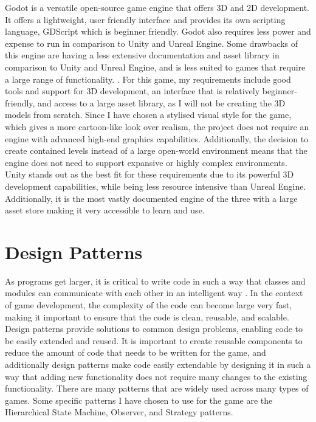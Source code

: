 \documentclass[]{final_report}
\begin{document}
Godot is a versatile open-source game engine that offers 3D and 2D development. It offers a lightweight, user friendly interface and provides its own scripting language, GDScript which is beginner friendly. Godot also requires less power and expense to run in comparison to Unity and Unreal Engine. Some drawbacks of this engine are having a less extensive documentation and asset library in comparison to Unity and Unreal Engine, and is less suited to games that require a large range of functionality. \cite{hatton_2024}. \newline
For this game, my requirements include good tools and support for 3D development, an interface that is relatively beginner-friendly, and access to a large asset library, as I will not be creating the 3D models from scratch. Since I have chosen a stylised visual style for the game, which gives a more cartoon-like look over realism, the project does not require an engine with advanced high-end graphics capabilities. Additionally, the decision to create contained levels instead of a large open-world environment means that the engine does not need to support expansive or highly complex environments.
Unity stands out as the best fit for these requirements due to its powerful 3D development capabilities, while being less resource intensive than Unreal Engine. Additionally, it is the most vastly documented engine of the three with a large asset store making it very accessible to learn and use.
\section{Design Patterns}
As programs get larger, it is critical to write code in such a way that classes and modules can communicate with each other in an intelligent way \cite{Doran2017}. In the context of game development, the complexity of the code can become large very fast, making it important to ensure that the code is clean, reusable, and scalable. Design patterns provide solutions to common design problems, enabling code to be easily extended and reused. It is important to create reusable components to reduce the amount of code that needs to be written for the game, and additionally design patterns make code easily extendable by designing it in such a way that adding new functionality does not require many changes to the existing functionality. There are many patterns that are widely used across many types of games. Some specific patterns I have chosen to use for the game are the Hierarchical State Machine, Observer, and Strategy patterns. 
\end{document}
